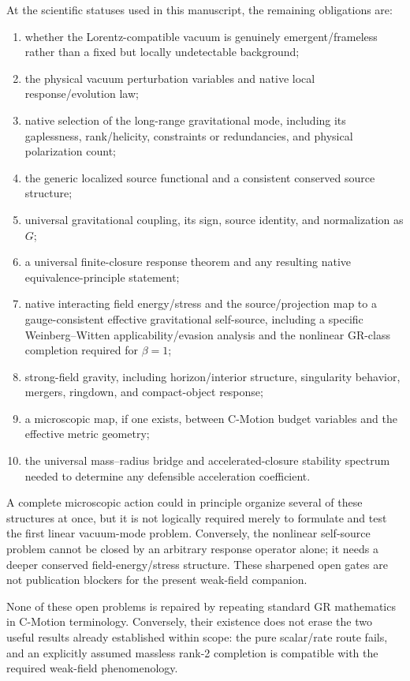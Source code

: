 \documentclass[11pt]{article}
\newcommand{\cmotion}{\mbox{C-Motion}}
\theoremstyle{plain}
\theoremstyle{remark}
\begin{document}
At the scientific statuses used in this manuscript, the remaining obligations are:
\begin{enumerate}[leftmargin=*]
  \item whether the Lorentz-compatible vacuum is genuinely emergent/frameless rather than
        a fixed but locally undetectable background;
  \item the physical vacuum perturbation variables and native local response/evolution law;
  \item native selection of the long-range gravitational mode, including its gaplessness,
        rank/helicity, constraints or redundancies, and physical polarization count;
  \item the generic localized source functional and a consistent conserved source structure;
  \item universal gravitational coupling, its sign, source identity, and normalization as $G$;
  \item a universal finite-closure response theorem and any resulting native
        equivalence-principle statement;
  \item native interacting field energy/stress and the source/projection map to a
        gauge-consistent effective gravitational self-source, including a specific
        Weinberg--Witten applicability/evasion analysis and the nonlinear GR-class
        completion required for $\beta=1$;
  \item strong-field gravity, including horizon/interior structure, singularity behavior,
        mergers, ringdown, and compact-object response;
  \item a microscopic map, if one exists, between \cmotion{} budget variables and the
        effective metric geometry;
  \item the universal mass--radius bridge and accelerated-closure stability spectrum needed
        to determine any defensible acceleration coefficient.
\end{enumerate}

A complete microscopic action could in principle organize several of these structures at
once, but it is not logically required merely to formulate and test the first linear
vacuum-mode problem.  Conversely, the nonlinear self-source problem cannot be closed by an
arbitrary response operator alone; it needs a deeper conserved field-energy/stress structure.
These sharpened open gates are not publication blockers for the present weak-field companion.

None of these open problems is repaired by repeating standard GR mathematics in \cmotion{}
terminology.  Conversely, their existence does not erase the two useful results already
established within scope: the pure scalar/rate route fails, and an explicitly assumed massless
rank-2 completion is compatible with the required weak-field phenomenology.
\end{document}
